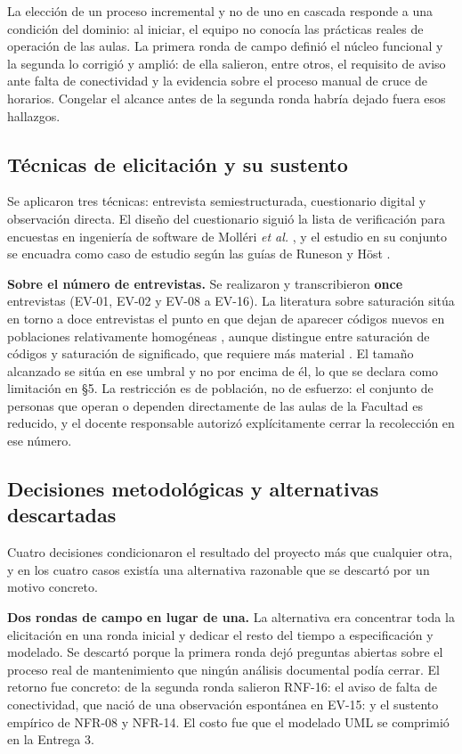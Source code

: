 La elecci\'on de un proceso incremental y no de uno en cascada responde a una condici\'on del dominio: al iniciar, el equipo no conoc\'ia las pr\'acticas reales de operaci\'on de las aulas. La primera ronda de campo defini\'o el n\'ucleo funcional y la segunda lo corrigi\'o y ampli\'o: de ella salieron, entre otros, el requisito de aviso ante falta de conectividad y la evidencia sobre el proceso manual de cruce de horarios. Congelar el alcance antes de la segunda ronda habr\'ia dejado fuera esos hallazgos.

\subsection{T\'ecnicas de elicitaci\'on y su sustento}

Se aplicaron tres t\'ecnicas: entrevista semiestructurada, cuestionario digital y observaci\'on directa. El dise\~no del cuestionario sigui\'o la lista de verificaci\'on para encuestas en ingenier\'ia de software de Moll\'eri \emph{et al.} \cite{molleri2020empirically}, y el estudio en su conjunto se encuadra como caso de estudio seg\'un las gu\'ias de Runeson y H\"ost \cite{runeson2009guidelines}.

\textbf{Sobre el n\'umero de entrevistas.} Se realizaron y transcribieron \textbf{once} entrevistas (EV-01, EV-02 y EV-08 a EV-16). La literatura sobre saturaci\'on sit\'ua en torno a doce entrevistas el punto en que dejan de aparecer c\'odigos nuevos en poblaciones relativamente homog\'eneas \cite{guest2006how}, aunque distingue entre saturaci\'on de c\'odigos y saturaci\'on de significado, que requiere m\'as material \cite{hennink2017code}. El tama\~no alcanzado se sit\'ua en ese umbral y no por encima de \'el, lo que se declara como limitaci\'on en \S5. La restricci\'on es de poblaci\'on, no de esfuerzo: el conjunto de personas que operan o dependen directamente de las aulas de la Facultad es reducido, y el docente responsable autoriz\'o expl\'icitamente cerrar la recolecci\'on en ese n\'umero.

\subsection{Decisiones metodol\'ogicas y alternativas descartadas}

Cuatro decisiones condicionaron el resultado del proyecto m\'as que cualquier otra, y en los cuatro casos exist\'ia una alternativa razonable que se descart\'o por un motivo concreto.

\textbf{Dos rondas de campo en lugar de una.} La alternativa era concentrar toda la elicitaci\'on en una ronda inicial y dedicar el resto del tiempo a especificaci\'on y modelado. Se descart\'o porque la primera ronda dej\'o preguntas abiertas sobre el proceso real de mantenimiento que ning\'un an\'alisis documental pod\'ia cerrar. El retorno fue concreto: de la segunda ronda salieron RNF-16: el aviso de falta de conectividad, que naci\'o de una observaci\'on espont\'anea en EV-15: y el sustento emp\'irico de NFR-08 y NFR-14. El costo fue que el modelado UML se comprimi\'o en la Entrega 3.

